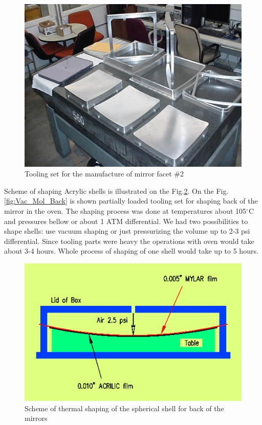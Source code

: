 \begin{figure}[ht]
    \centering
    \includegraphics[width=1.0\linewidth]{images/Tool_on_tbl.jpg}
    \caption{Tooling set for the manufacture of mirror facet \#2}
    \label{fig:Tooling}
\end{figure}

\indent Scheme of shaping Acrylic shells is illustrated on the  Fig.\ref{fig:Shaping_new}. On the Fig.\ref{fig:Vac_Mol_Back}
is shown partially loaded tooling set for shaping back of the mirror in the oven. The shaping process was done at temperatures
about 105$^\circ$C and pressures bellow or about 1 ATM differential. We had two possibilities to shape shells: use vacuum shaping or just pressurizing the volume up to 2-3 psi differential. Since tooling parts were heavy the operations with oven would take about 3-4 hours. Whole process of shaping of one shell would take up to 5 hours.

\begin{figure}[ht]
    \centering
    \includegraphics[width=1.0\linewidth]{images/Shaping_new.png}
    \caption{Scheme of thermal shaping of the spherical shell for back of the mirrors}
    \label{fig:Shaping_new}
\end{figure}

